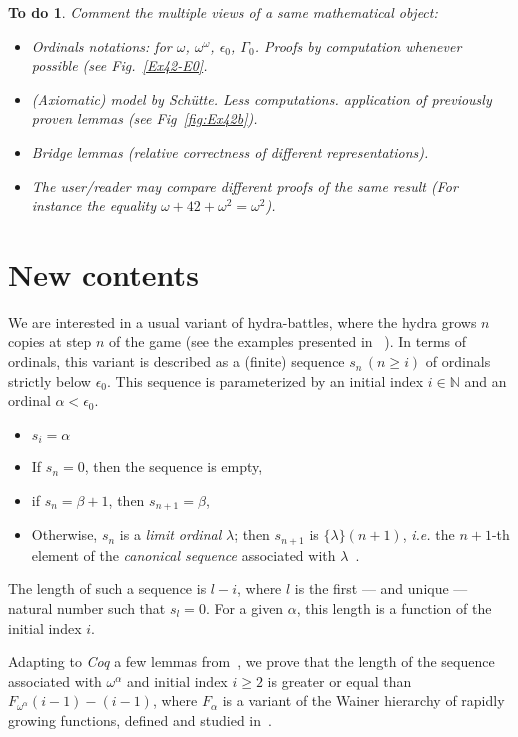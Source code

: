 \documentclass{easychair}
\newcommand{\canonseq}[2]{\mbox{$\{#1\}(#2)$}}
\newtheorem{todo}{To do}
\begin{document}
\begin{todo}
  Comment the multiple views of a same mathematical object:
  \begin{itemize}
  \item Ordinals notations: for $\omega$, $\omega^\omega$,
    $\epsilon_0$, $\Gamma_0$. Proofs by computation whenever possible (see Fig.~\ref{Ex42-E0}.
  \item (Axiomatic) model by Schütte. Less computations.
    application of previously proven lemmas (see Fig~\ref{fig:Ex42b}).
  \item Bridge lemmas (relative correctness of different representations).
    \item The user/reader may compare  different proofs of the same result (For instance the equality $\omega+42+\omega^2= \omega^2$).
  \end{itemize}
\end{todo}

\section{New contents}
We are interested in a usual variant of hydra-battles, where the hydra grows $n$ copies at step $n$ of the game (see the examples presented in ~\cite{KP82, BauerHydra}).
In terms of ordinals, this variant is described as a (finite) sequence $s_n\,(n\geq i)$ of ordinals strictly below $\epsilon_0$.
This sequence is parameterized by an initial index $i\in\mathbb{N}$ and an ordinal $\alpha<\epsilon_0$.

\begin{itemize}
  \item $s_i=\alpha$
\item If $s_n=0$, then the sequence is empty,
\item if $s_n=\beta+1$, then $s_{n+1}=\beta$,
\item Otherwise, $s_n$ is a \emph{limit ordinal} $\lambda$; then $s_{n+1}$ is $\canonseq{\lambda}{n+1}$, \emph{i.e.} the
    $n+1$-th element of the \emph{canonical sequence} associated with $\lambda$~\cite{KS81}.
\end{itemize} 

The length of such a sequence is $l-i$, where $l$ is the first --- and unique --- natural number such that $s_l=0$.
For a given $\alpha$, this length is a function of 
the initial index $i$.

Adapting to \emph{Coq} a few lemmas from~\cite{KS81}, we prove that the length  of the sequence associated with
$\omega^\alpha$ and initial index $i\geq 2$ is greater or equal than
$F_{\omega^\alpha}(i-1)-(i-1)$, where $F_\alpha$ is a variant of the Wainer hierarchy of rapidly growing functions, defined and studied in~\cite{KS81}.
\end{document}
